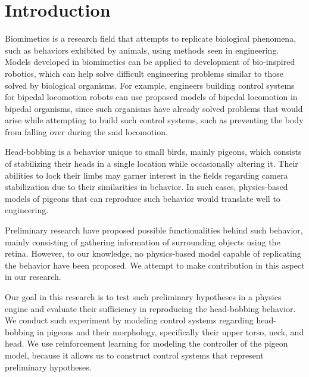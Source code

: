 \chapter{Introduction}
Biomimetics is a research field that attempts to replicate biological phenomena, such as behaviors exhibited by animals, using methods seen in engineering.
Models developed in biomimetics can be applied to development of bio-inspired robotics, which can help solve difficult engineering problems similar to those solved by biological organisms.
  For example, engineers building control systems for bipedal locomotion robots can use proposed models of bipedal locomotion in bipedal organisms, since such organisms have already solved problems that would arise while attempting to build such control systems, such as preventing the body from falling over during the said locomotion.

Head-bobbing is a behavior unique to small birds, mainly pigeons, which consists of stabilizing their heads in a single location while occasionally altering it.
Their abilities to lock their limbs may garner interest in the fields regarding camera stabilization due to their similarities in behavior.
In such cases, physics-based models of pigeons that can reproduce such behavior would translate well to engineering.

Preliminary research have proposed possible functionalities behind such behavior, mainly consisting of gathering information of surrounding objects using the retina. However, to our knowledge, no physics-based model capable of replicating the behavior have been proposed. We attempt to make contribution in this aspect in our research.

Our goal in this research is to test such preliminary hypotheses in a physics engine and evaluate their sufficiency in reproducing the head-bobbing behavior.
We conduct such experiment by modeling control systems regarding head-bobbing in pigeons and their morphology, specifically their upper torso, neck, and head.
  We use reinforcement learning for modeling the controller of the pigeon model, because it allows us to construct control systems that represent preliminary hypotheses.

